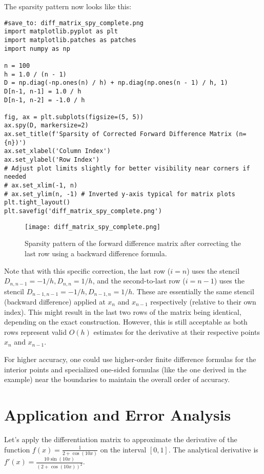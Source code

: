 \documentclass{article}
\begin{document}
The sparsity pattern now looks like this:
\begin{verbatim}
#save_to: diff_matrix_spy_complete.png
import matplotlib.pyplot as plt
import matplotlib.patches as patches
import numpy as np

n = 100
h = 1.0 / (n - 1)
D = np.diag(-np.ones(n) / h) + np.diag(np.ones(n - 1) / h, 1)
D[n-1, n-1] = 1.0 / h
D[n-1, n-2] = -1.0 / h

fig, ax = plt.subplots(figsize=(5, 5))
ax.spy(D, markersize=2)
ax.set_title(f'Sparsity of Corrected Forward Difference Matrix (n={n})')
ax.set_xlabel('Column Index')
ax.set_ylabel('Row Index')
# Adjust plot limits slightly for better visibility near corners if needed
# ax.set_xlim(-1, n)
# ax.set_ylim(n, -1) # Inverted y-axis typical for matrix plots
plt.tight_layout()
plt.savefig('diff_matrix_spy_complete.png')
\end{verbatim}

\begin{figure}[H]
\centering
\texttt{[image: diff\_matrix\_spy\_complete.png]}
\caption{Sparsity pattern of the forward difference matrix after correcting the last row using a backward difference formula.}
\label{fig:diff_matrix_spy_complete}
\end{figure}

Note that with this specific correction, the last row ($i=n$) uses the stencil $D_{n,n-1}=-1/h, D_{n,n}=1/h$, and the second-to-last row ($i=n-1$) uses the stencil $D_{n-1,n-1}=-1/h, D_{n-1,n}=1/h$. These are essentially the same stencil (backward difference) applied at $x_n$ and $x_{n-1}$ respectively (relative to their own index). This might result in the last two rows of the matrix being identical, depending on the exact construction. However, this is still acceptable as both rows represent valid $O(h)$ estimates for the derivative at their respective points $x_n$ and $x_{n-1}$.

For higher accuracy, one could use higher-order finite difference formulas for the interior points and specialized one-sided formulas (like the one derived in the example) near the boundaries to maintain the overall order of accuracy.

\section{Application and Error Analysis}

Let's apply the differentiation matrix to approximate the derivative of the function $f(x) = \frac{1}{2 + \cos(10x)}$ on the interval $[0, 1]$. The analytical derivative is $f'(x) = \frac{10 \sin(10x)}{(2 + \cos(10x))^2}$.
\end{document}
